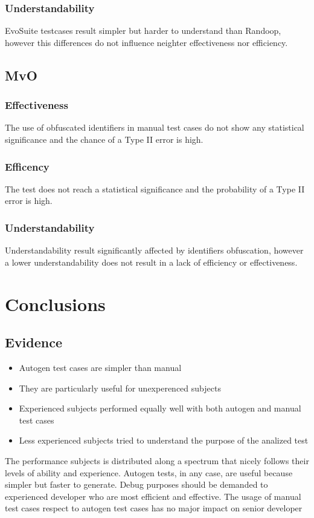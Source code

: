 	\subsubsection{Understandability}
		EvoSuite testcases result simpler but harder to understand than Randoop, however this differences do not influence neighter effectiveness nor efficiency.
		
	\subsection{MvO}
	\subsubsection{Effectiveness}
		The use of obfuscated identifiers in manual test cases do not show any statistical significance and the chance of a Type II error is high.
		
	\subsubsection{Efficency}
		The test does not reach a statistical significance and the probability of a Type II error is high.
		
	\subsubsection{Understandability}
		Understandability result significantly affected by identifiers obfuscation, however a lower understandability does not result in a lack of efficiency or effectiveness.
	
	\section{Conclusions}
	\subsection{Evidence}
	\begin{itemize}
	
		\item Autogen test cases are simpler than manual
		\item They are particularly useful for unexperenced subjects
		\item Experienced subjects performed equally well with both autogen and manual test cases
		\item Less experienced subjects tried to understand the purpose of the analized test
	\end{itemize}
	The performance subjects is distributed along a spectrum that nicely follows their levels of ability and experience.	Autogen tests, in any case, are useful because simpler but faster to generate. Debug purposes should be demanded to experienced developer who are most efficient and effective. The usage of manual test cases respect to autogen test cases has no major impact on senior developer\\
		
